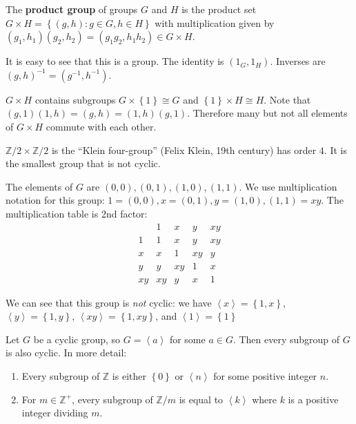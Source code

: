 \documentclass{notes}
\begin{document}
\begin{defn}
  The {\boldmath \bfseries product group} of groups $G$ and $H$ is the product set $G \times H = \left \{ (g, h) : g \in G, h \in H \right \}$ with multiplication given by $(g_1, h_1) (g_2, h_2) = (g_1 g_2, h_1 h_2) \in G \times H$.
\end{defn}

It is easy to see that this is a group.
The identity is $(1_G, 1_H)$.
Inverses are $(g, h)^{-1} = (g^{-1}, h^{-1})$.

\begin{note}
  $G \times H$ contains subgroups $G \times \left \{ 1 \right \} \cong G$ and $\left \{ 1 \right \} \times H \cong H$.
  Note that $(g, 1) (1, h) = (g, h) = (1, h) (g, 1)$.
  Therefore many but not all elements of $G \times H$ commute with each other.
\end{note}

\begin{eg}
  $\mathbb Z / 2 \times \mathbb Z / 2$ is the ``Klein four-group'' (Felix Klein, 19th century) has order $4$.
  It is the smallest group that is not cyclic.

  The elements of $G$ are $(0, 0), (0, 1), (1, 0), (1, 1)$.
  We use multiplication notation for this group: $1 = (0, 0), x = (0, 1), y = (1, 0), (1, 1) = x y$.
  The multiplication table is 2nd factor: 
  \[
    \begin{array}{c|cccc}
      & 1 & x & y & x y \\ 
      \hline
      1 & 1 & x & y & x y \\ 
      x & x & 1 & x y & y \\ 
      y & y & x y & 1 & x \\ 
      x y & x y & y & x & 1
    \end{array}
  \]

  We can see that this group is \textit{not} cyclic: we have $\left \langle x \right \rangle = \left \{ 1, x \right \}$, $\left \langle y \right \rangle = \left \{ 1, y \right \}$, $\left \langle x y \right \rangle = \left \{ 1, x y \right \}$, and $\left \langle 1 \right \rangle = \left \{ 1 \right \}$
\end{eg}

\begin{thm}
  Let $G$ be a cyclic group, so $G = \left \langle a \right \rangle$ for some $a \in G$.
  Then every subgroup of $G$ is also cyclic.
  In more detail: 
  \begin{enumerate}
    \item Every subgroup of $\mathbb Z$ is either $\left \{ 0 \right \}$ or $\left \langle n \right \rangle$ for some positive integer $n$.

    \item For $m \in \mathbb Z^+$, every subgroup of $\mathbb Z / m$ is equal to $\left \langle k \right \rangle$ where $k$ is a positive integer dividing $m$.
  \end{enumerate}
\end{thm}
\end{document}
